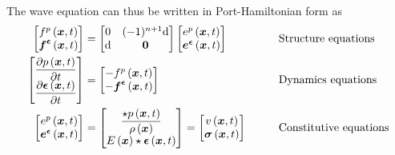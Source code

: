 The wave equation can thus be written in Port-Hamiltonian form as
\begin{equation}
  \begin{aligned}
    \begin{bmatrix}
       f^{p}\left(  \boldsymbol{x} ,t \right)  \\
        \boldsymbol{f} ^{ \boldsymbol{\epsilon} }\left(  \boldsymbol{x} ,t \right) 
    \end{bmatrix}&=\begin{bmatrix}
    0 & (-1)^{n+1}  \mathrm{d}   \\
      \mathrm{d}   &  \boldsymbol{0} 
    \end{bmatrix}\begin{bmatrix}
       e^{p}\left(  \boldsymbol{x} ,t \right)  \\
        \boldsymbol{e} ^{ \boldsymbol{\epsilon} }\left(  \boldsymbol{x} ,t \right) 
    \end{bmatrix}&\qquad&\text{Structure equations}\\
    \begin{bmatrix}
       \dfrac{\partial  p\left(  \boldsymbol{x} ,t \right) }{\partial t}  \\
       \dfrac{\partial   \boldsymbol{\epsilon} \left(  \boldsymbol{x} ,t \right) }{\partial t}       
    \end{bmatrix}&=\begin{bmatrix}
      - f^{p}\left(  \boldsymbol{x} ,{t} \right)  \\
      -  \boldsymbol{f} ^{ \boldsymbol{\epsilon} }\left(  \boldsymbol{x} ,{t} \right)  \\          
    \end{bmatrix}&\qquad&\text{Dynamics equations}\\
    \begin{bmatrix}
       e^{p}\left(  \boldsymbol{x} ,t \right) \\
        \boldsymbol{e} ^{ \boldsymbol{\epsilon} }\left(  \boldsymbol{x} ,t \right) \\
    \end{bmatrix}&=\begin{bmatrix}
    \dfrac{  \star  p\left(  \boldsymbol{x} ,t \right)  }{ \rho\left(  \boldsymbol{x}  \right) }\\
     E\left(  \boldsymbol{x}  \right)   \star   \boldsymbol{\epsilon} \left(  \boldsymbol{x} ,t \right)  
    \end{bmatrix}=\begin{bmatrix}
     v\left(  \boldsymbol{x} ,t \right) \\
      \boldsymbol{\sigma} \left(  \boldsymbol{x} ,t \right) 
    \end{bmatrix}&\qquad&\text{Constitutive equations}
  \end{aligned}
\end{equation}

